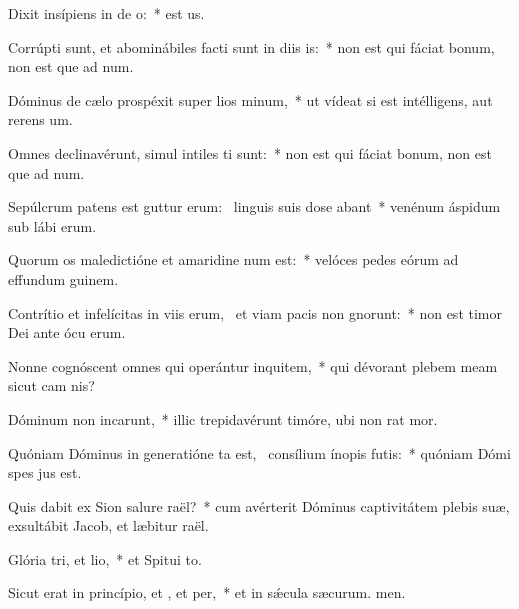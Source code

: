 \item Dixit insípiens in de o:~*  est us.
\item Corrúpti sunt, et abominábiles facti sunt in diis is:~* non est qui fáciat bonum, non est que ad num.
\item Dóminus de cælo prospéxit super lios minum,~* ut vídeat si est intélligens, aut rerens um.
\item Omnes declinavérunt, simul intiles ti sunt:~* non est qui fáciat bonum, non est que ad num.
\item Sepúlcrum patens est guttur erum:~\pscross{} linguis suis dose abant~* venénum áspidum sub lábi erum.
\item Quorum os maledictióne et amaridine num est:~* velóces pedes eórum ad effundum guinem.
\item Contrítio et infelícitas in viis erum,~\pscross{} et viam pacis non gnorunt:~* non est timor Dei ante ócu erum.
\item Nonne cognóscent omnes qui operántur inquitem,~* qui dévorant plebem meam sicut cam nis?
\item Dóminum non incarunt,~* illic trepidavérunt timóre, ubi non rat mor.
\item Quóniam Dóminus in generatióne ta est,~\pscross{} consílium ínopis futis:~* quóniam Dómi spes jus est.
\item Quis dabit ex Sion salure raël?~* cum avérterit Dóminus captivitátem plebis suæ, exsultábit Jacob, et læbitur raël.
\item Glória tri, et lio,~* et Spitui to.
\item Sicut erat in princípio, et , et per,~* et in sǽcula sæcurum. men.
